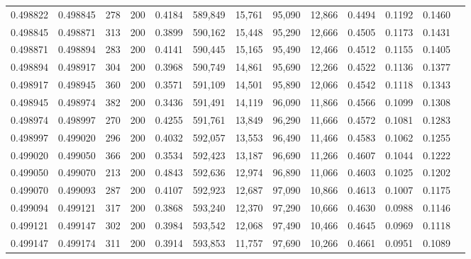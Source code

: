 \begin{tabular}{rrrrrrrrrrrrr}
0.498822 & 0.498845 &   278 & 200 &                                     0.4184 & 589,849 &  15,761 &  95,090 &  12,866 & 0.4494 & 0.1192 & 0.1460 \\
0.498845 & 0.498871 &   313 & 200 &                                     0.3899 & 590,162 &  15,448 &  95,290 &  12,666 & 0.4505 & 0.1173 & 0.1431 \\
0.498871 & 0.498894 &   283 & 200 &                                     0.4141 & 590,445 &  15,165 &  95,490 &  12,466 & 0.4512 & 0.1155 & 0.1405 \\
0.498894 & 0.498917 &   304 & 200 &                                     0.3968 & 590,749 &  14,861 &  95,690 &  12,266 & 0.4522 & 0.1136 & 0.1377 \\
0.498917 & 0.498945 &   360 & 200 &                                     0.3571 & 591,109 &  14,501 &  95,890 &  12,066 & 0.4542 & 0.1118 & 0.1343 \\
0.498945 & 0.498974 &   382 & 200 &                                     0.3436 & 591,491 &  14,119 &  96,090 &  11,866 & 0.4566 & 0.1099 & 0.1308 \\
0.498974 & 0.498997 &   270 & 200 &                                     0.4255 & 591,761 &  13,849 &  96,290 &  11,666 & 0.4572 & 0.1081 & 0.1283 \\
0.498997 & 0.499020 &   296 & 200 &                                     0.4032 & 592,057 &  13,553 &  96,490 &  11,466 & 0.4583 & 0.1062 & 0.1255 \\
0.499020 & 0.499050 &   366 & 200 &                                     0.3534 & 592,423 &  13,187 &  96,690 &  11,266 & 0.4607 & 0.1044 & 0.1222 \\
0.499050 & 0.499070 &   213 & 200 &                                     0.4843 & 592,636 &  12,974 &  96,890 &  11,066 & 0.4603 & 0.1025 & 0.1202 \\
0.499070 & 0.499093 &   287 & 200 &                                     0.4107 & 592,923 &  12,687 &  97,090 &  10,866 & 0.4613 & 0.1007 & 0.1175 \\
0.499094 & 0.499121 &   317 & 200 &                                     0.3868 & 593,240 &  12,370 &  97,290 &  10,666 & 0.4630 & 0.0988 & 0.1146 \\
0.499121 & 0.499147 &   302 & 200 &                                     0.3984 & 593,542 &  12,068 &  97,490 &  10,466 & 0.4645 & 0.0969 & 0.1118 \\
0.499147 & 0.499174 &   311 & 200 &                                     0.3914 & 593,853 &  11,757 &  97,690 &  10,266 & 0.4661 & 0.0951 & 0.1089 \\

\end{tabular}
